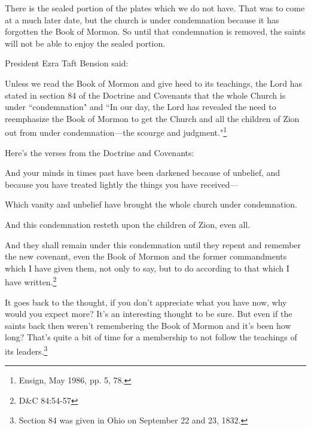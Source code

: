 There is the sealed portion of the plates which we do not have. That was to come at a
much later date, but the church is under condemnation because it has forgotten the
Book of Mormon. So until that condemnation is removed, the saints will not be able to
enjoy the sealed portion.

President Ezra Taft Bension said:

\begin{displayquote}
Unless we read the Book of Mormon and give heed to its teachings, the Lord has stated 
in section 84 of the Doctrine and Covenants that the whole Church is under 
``condemnation" and ``In our day, the Lord has revealed the need to reemphasize the 
Book of Mormon to get the Church and all the children of Zion out from under 
condemnation—the scourge and judgment."\footnote{Ensign, May 1986, pp. 5, 78.}
\end{displayquote}

Here's the verses from the Doctrine and Covenants:

\begin{displayquote}
And your minds in times past have been darkened because of unbelief, and because you 
have treated lightly the things you have received—

Which vanity and unbelief have brought the whole church under condemnation.

And this condemnation resteth upon the children of Zion, even all.

And they shall remain under this condemnation until they repent and remember the new 
covenant, even the Book of Mormon and the former commandments which I have given 
them, not only to say, but to do according to that which I have written.\footnote{
D\&C 84:54-57
}
\end{displayquote}

It goes back to the thought, if you don't appreciate what you have now, why would you
expect more? It's an interesting thought to be sure. But even if the saints back then
weren't remembering the Book of Mormon and it's been how long? That's quite a bit of
time for a membership to not follow the teachings of its leaders.\footnote{Section 84
was given in Ohio on September 22 and 23, 1832.} 